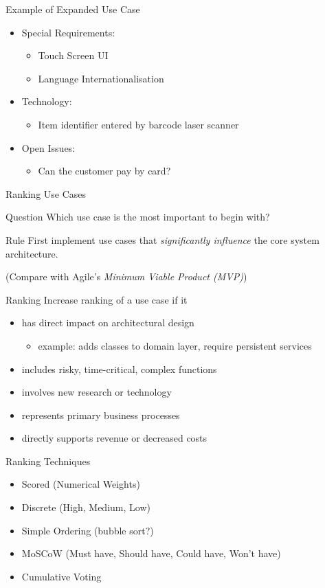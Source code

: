 \documentclass[10pt,t,a4paper]{beamer}
\begin{document}
\begin{frame}[shrink=20,label=sec-1-9]{Example of Expanded Use Case}
\begin{itemize}
\item Special Requirements:
\begin{itemize}
\item Touch Screen UI
\item Language Internationalisation
\end{itemize}
\item Technology:
\begin{itemize}
\item Item identifier entered by barcode laser scanner
\end{itemize}
\item Open Issues:
\begin{itemize}
\item Can the customer pay by card?
\end{itemize}
\end{itemize}
\end{frame}
\begin{frame}[label=sec-1-10]{Ranking Use Cases}
\begin{block}{Question}
Which use case is the most important to begin with?
\end{block}

\begin{block}{Rule}
First implement use cases that \emph{significantly influence} the core system architecture.

(Compare with Agile's \emph{Minimum Viable Product (MVP)})
\end{block}
\end{frame}
\begin{frame}[label=sec-1-11]{Ranking}
Increase ranking of a use case if it
\begin{itemize}
\item has direct impact on architectural design
\begin{itemize}
\item example: adds classes to domain layer, require persistent services
\end{itemize}
\item includes risky, time-critical, complex functions
\item involves new research or technology
\item represents primary business processes
\item directly supports revenue or decreased costs
\end{itemize}
\begin{block}{Ranking Techniques}
\begin{itemize}
\item Scored (Numerical Weights)
\item Discrete (High, Medium, Low)
\item Simple Ordering (bubble sort?)
\item MoSCoW (Must have, Should have, Could have, Won't have)
\item Cumulative Voting
\end{itemize}
\end{block}
\end{frame}
\end{document}
